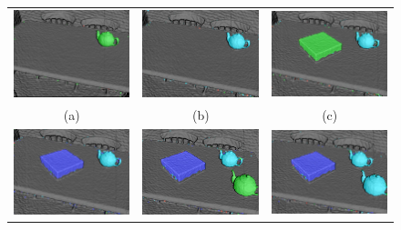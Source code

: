 \begin{figure}[!htbp]
  \centering
  \begin{tabular}{ccc}
    \includegraphics[width=.28\linewidth]{figures/moseg/objects1.png} &
    \includegraphics[width=.28\linewidth]{figures/moseg/objects2.png} &
    \includegraphics[width=.28\linewidth]{figures/moseg/objects3.png} \\ 
    (a) & (b) & (c) \\
    \includegraphics[width=.28\linewidth]{figures/moseg/objects4.png} &
    \includegraphics[width=.28\linewidth]{figures/moseg/objects5.png} &
    \includegraphics[width=.28\linewidth]{figures/moseg/objects6.png} \\ 

\end{tabular}
\end{figure}
